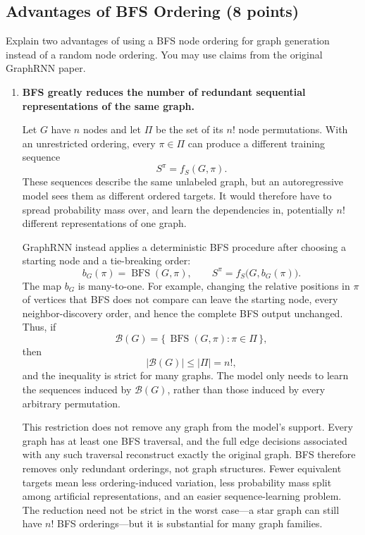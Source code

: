 \subsection{Advantages of BFS Ordering (8 points)}

Explain two advantages of using a BFS node ordering for graph generation
instead of a random node ordering. You may use claims from the original
GraphRNN paper.

\begin{solution}
\begin{enumerate}[label=\textbf{\arabic*.},leftmargin=*]
  \item \textbf{BFS greatly reduces the number of redundant sequential
    representations of the same graph.}

    Let \(G\) have \(n\) nodes and let \(\Pi\) be the set of its \(n!\) node
    permutations.  With an unrestricted ordering, every \(\pi\in\Pi\) can
    produce a different training sequence
    \[
      S^\pi=f_S(G,\pi).
    \]
    These sequences describe the same unlabeled graph, but an autoregressive
    model sees them as different ordered targets.  It would therefore have to
    spread probability mass over, and learn the dependencies in, potentially
    \(n!\) different representations of one graph.

    GraphRNN instead applies a deterministic BFS procedure after choosing a
    starting node and a tie-breaking order:
    \[
      b_G(\pi)=\operatorname{BFS}(G,\pi),\qquad
      S^\pi=f_S\bigl(G,b_G(\pi)\bigr).
    \]
    The map \(b_G\) is many-to-one.  For example, changing the relative
    positions in \(\pi\) of vertices that BFS does not compare can leave the
    starting node, every neighbor-discovery order, and hence the complete BFS
    output unchanged.  Thus, if
    \[
      \mathcal B(G)
      =\{\,\operatorname{BFS}(G,\pi):\pi\in\Pi\,\},
    \]
    then
    \[
      |\mathcal B(G)|\leq |\Pi|=n!,
    \]
    and the inequality is strict for many graphs.  The model only needs to
    learn the sequences induced by \(\mathcal B(G)\), rather than those
    induced by every arbitrary permutation.

    This restriction does not remove any graph from the model's support.
    Every graph has at least one BFS traversal, and the full edge decisions
    associated with any such traversal reconstruct exactly the original
    graph.  BFS therefore removes only redundant orderings, not graph
    structures.  Fewer equivalent targets mean less ordering-induced
    variation, less probability mass split among artificial representations,
    and an easier sequence-learning problem.  The reduction need not be
    strict in the worst case---a star graph can still have \(n!\) BFS
    orderings---but it is substantial for many graph families.


\end{enumerate}
\end{solution}
